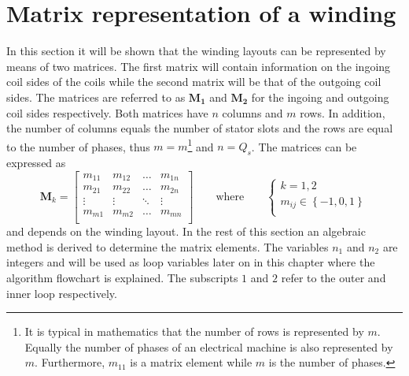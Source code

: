 \chapter{Matrix representation of a winding}
In this section it will be shown that the winding layouts can be represented by means of two matrices. The first matrix will contain information on the ingoing coil sides of the coils while the second matrix will be that of the outgoing coil sides. The matrices are referred to as $\mathbf{M_1}$ and $\mathbf{M_{2}}$ for the ingoing and outgoing coil sides respectively. Both matrices have $n$ columns and $m$ rows. In addition, the number of columns equals the number of stator slots and the rows are equal to the number of phases, thus $m=m$\footnote{It is typical in mathematics that the number of rows is represented by $m$. Equally the number of phases of an electrical machine is also represented by $m$. Furthermore, $m_{11}$ is a matrix element while $m$ is the number of phases.} and $n=Q_s$. The matrices can be expressed as
\begin{equation}
  \label{eqn:M_matrix}
  \mathbf{M}_k = \left[
  \begin{array}{cccc}
     m_{11} & m_{12} & \ldots & m_{1n}\\
     m_{21} & m_{22} & \ldots & m_{2n}\\
     \vdots & \vdots & \ddots & \vdots\\
     m_{m1} & m_{m2} & \ldots & m_{mn}\\
  \end{array} \right]
  \qquad \mbox{where} \qquad
  \begin{cases}
     k = 1,2\\
     m_{ij} \in \left\{-1,0,1\right\}\\
  \end{cases}
\end{equation}
and depends on the winding layout. In the rest of this section an algebraic method is derived to determine the matrix elements. The variables $n_1$ and $n_2$ are integers and will be used as loop variables later on in this chapter where the algorithm flowchart is explained. The subscripts $1$ and $2$ refer to the outer and inner loop respectively. 

